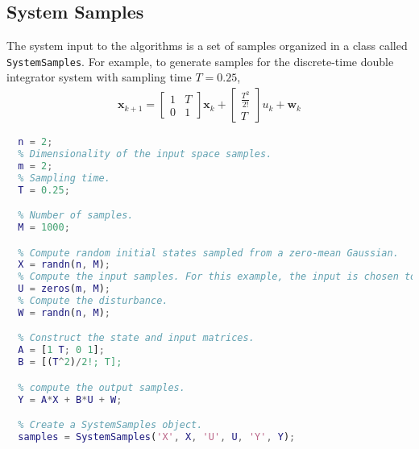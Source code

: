 \documentclass[11pt]{article}
\begin{document}
\subsection{System Samples}

The system input to the algorithms is a set of samples organized in a class called \verb|SystemSamples|.
For example, to generate samples for the discrete-time double integrator system
with sampling time $T = 0.25$,
\begin{align}
  \boldsymbol{x}_{k+1} =
  \begin{bmatrix}
    1 & T \\
    0 & 1
  \end{bmatrix}
  \boldsymbol{x}_{k} +
  \begin{bmatrix}
    \frac{T^{2}}{2!} \\
    T
  \end{bmatrix}
  u_{k} +
  \boldsymbol{w}_{k}
\end{align}

\begin{lstlisting}[language=Matlab]
  % Dimensionality of the state space samples.
  n = 2;
  % Dimensionality of the input space samples.
  m = 2;
  % Sampling time.
  T = 0.25;

  % Number of samples.
  M = 1000;

  % Compute random initial states sampled from a zero-mean Gaussian.
  X = randn(n, M);
  % Compute the input samples. For this example, the input is chosen to be 0.
  U = zeros(m, M);
  % Compute the disturbance.
  W = randn(n, M);

  % Construct the state and input matrices.
  A = [1 T; 0 1];
  B = [(T^2)/2!; T];

  % compute the output samples.
  Y = A*X + B*U + W;

  % Create a SystemSamples object.
  samples = SystemSamples('X', X, 'U', U, 'Y', Y);
\end{lstlisting}





\end{document}
